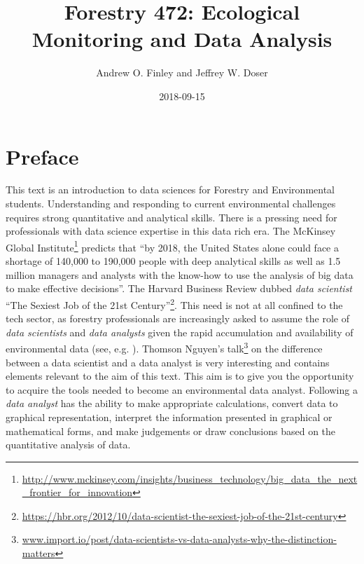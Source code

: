 \documentclass[]{krantz}
\title{Forestry 472: Ecological Monitoring and Data Analysis}
\author{Andrew O. Finley and Jeffrey W. Doser}
\date{2018-09-15}
\renewcommand{\href}[2]{#2\footnote{\url{#1}}}
\theoremstyle{definition}
\theoremstyle{definition}
\theoremstyle{definition}
\theoremstyle{remark}
\begin{document}
\maketitle


\thispagestyle{empty}

\setlength{\abovedisplayskip}{-5pt}
\setlength{\abovedisplayshortskip}{-5pt}

\mainmatter

{
\hypersetup{linkcolor=black}
\setcounter{tocdepth}{2}
\tableofcontents
}
\listoftables
\listoffigures
\chapter*{Preface}\label{preface}


This text is an introduction to data sciences for Forestry and
Environmental students. Understanding and responding to current
environmental challenges requires strong quantitative and analytical
skills. There is a pressing need for professionals with data science
expertise in this data rich era. The
\href{http://www.mckinsey.com/insights/business_technology/big_data_the_next_frontier_for_innovation}{McKinsey
Global Institute} predicts that ``by 2018, the United States alone could
face a shortage of 140,000 to 190,000 people with deep analytical skills
as well as 1.5 million managers and analysts with the know-how to use
the analysis of big data to make effective decisions''. The Harvard
Business Review dubbed \emph{data scientist}
\href{https://hbr.org/2012/10/data-scientist-the-sexiest-job-of-the-21st-century}{``The
Sexiest Job of the 21st Century''}. This need is not at all confined to
the tech sector, as forestry professionals are increasingly asked to
assume the role of \emph{data scientists} and \emph{data analysts} given
the rapid accumulation and availability of environmental data (see, e.g.
\citet{Schimel2015}).
\href{www.import.io/post/data-scientists-vs-data-analysts-why-the-distinction-matters}{Thomson
Nguyen's talk} on the difference between a data scientist and a data
analyst is very interesting and contains elements relevant to the aim of
this text. This aim is to give you the opportunity to acquire the tools
needed to become an environmental data analyst. Following
\citet{Bravo16} a \emph{data analyst} has the ability to make
appropriate calculations, convert data to graphical representation,
interpret the information presented in graphical or mathematical forms,
and make judgements or draw conclusions based on the quantitative
analysis of data.
\end{document}
